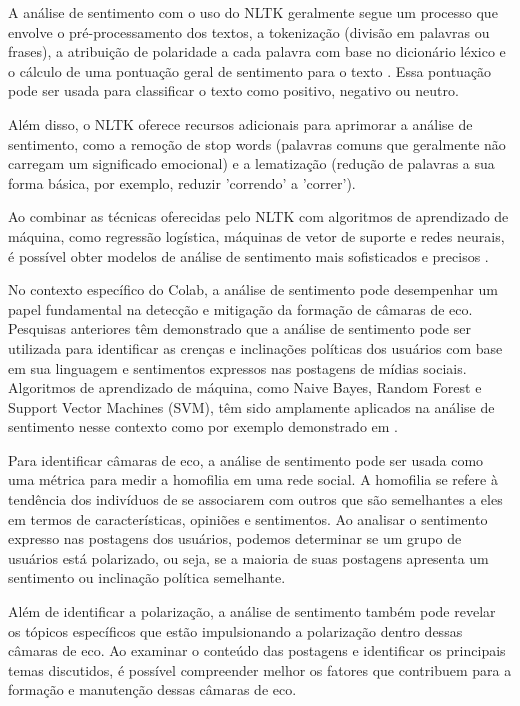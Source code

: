 A análise de sentimento com o uso do NLTK geralmente segue um processo que envolve o pré-processamento dos textos, a tokenização (divisão em palavras ou frases), a atribuição de polaridade a cada palavra com base no dicionário léxico e o cálculo de uma pontuação geral de sentimento para o texto \cite{2013_Haddi}. Essa pontuação pode ser usada para classificar o texto como positivo, negativo ou neutro.

Além disso, o NLTK oferece recursos adicionais para aprimorar a análise de sentimento, como a remoção de stop words (palavras comuns que geralmente não carregam um significado emocional) e a lematização (redução de palavras a sua forma básica, por exemplo, reduzir 'correndo' a 'correr').

Ao combinar as técnicas oferecidas pelo NLTK com algoritmos de aprendizado de máquina, como regressão logística, máquinas de vetor de suporte e redes neurais, é possível obter modelos de análise de sentimento mais sofisticados e precisos \cite{2014_Kim}.

No contexto específico do Colab, a análise de sentimento pode desempenhar um papel fundamental na detecção e mitigação da formação de câmaras de eco. Pesquisas anteriores têm demonstrado que a análise de sentimento pode ser utilizada para identificar as crenças e inclinações políticas dos usuários com base em sua linguagem e sentimentos expressos nas postagens de mídias sociais. Algoritmos de aprendizado de máquina, como Naive Bayes, Random Forest e Support Vector Machines (SVM), têm sido amplamente aplicados na análise de sentimento nesse contexto como por exemplo demonstrado em .

Para identificar câmaras de eco, a análise de sentimento pode ser usada como uma métrica para medir a homofilia em uma rede social. A homofilia se refere à tendência dos indivíduos de se associarem com outros que são semelhantes a eles em termos de características, opiniões e sentimentos. Ao analisar o sentimento expresso nas postagens dos usuários, podemos determinar se um grupo de usuários está polarizado, ou seja, se a maioria de suas postagens apresenta um sentimento ou inclinação política semelhante.

Além de identificar a polarização, a análise de sentimento também pode revelar os tópicos específicos que estão impulsionando a polarização dentro dessas câmaras de eco. Ao examinar o conteúdo das postagens e identificar os principais temas discutidos, é possível compreender melhor os fatores que contribuem para a formação e manutenção dessas câmaras de eco.

